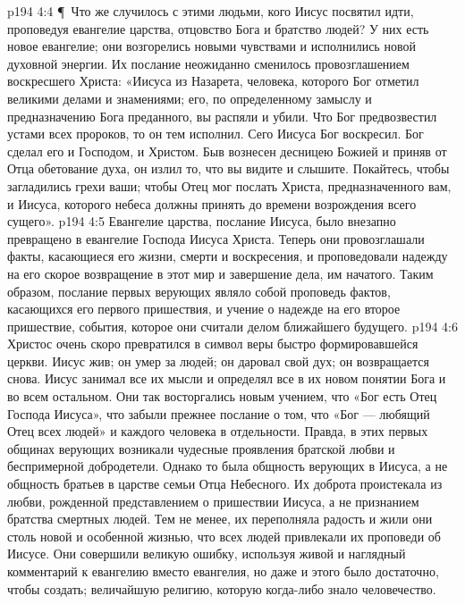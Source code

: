 \vs p194 4:4 \P\ Что же случилось с этими людьми, кого Иисус посвятил идти, проповедуя евангелие царства, отцовство Бога и братство людей? У них есть новое евангелие; они возгорелись новыми чувствами и исполнились новой духовной энергии. Их послание неожиданно сменилось провозглашением воскресшего Христа: «Иисуса из Назарета, человека, которого Бог отметил великими делами и знамениями; его, по определенному замыслу и предназначению Бога преданного, вы распяли и убили. Что Бог предвозвестил устами всех пророков, то он тем исполнил. Сего Иисуса Бог воскресил. Бог сделал его и Господом, и Христом. Быв вознесен десницею Божией и приняв от Отца обетование духа, он излил то, что вы видите и слышите. Покайтесь, чтобы загладились грехи ваши; чтобы Отец мог послать Христа, предназначенного вам, и Иисуса, которого небеса должны принять до времени возрождения всего сущего».
\vs p194 4:5 Евангелие царства, послание Иисуса, было внезапно превращено в евангелие Господа Иисуса Христа. Теперь они провозглашали факты, касающиеся его жизни, смерти и воскресения, и проповедовали надежду на его скорое возвращение в этот мир и завершение дела, им начатого. Таким образом, послание первых верующих являло собой проповедь фактов, касающихся его первого пришествия, и учение о надежде на его второе пришествие, события, которое они считали делом ближайшего будущего.
\vs p194 4:6 Христос очень скоро превратился в символ веры быстро формировавшейся церкви. Иисус жив; он умер за людей; он даровал свой дух; он возвращается снова. Иисус занимал все их мысли и определял все в их новом понятии Бога и во всем остальном. Они так восторгались новым учением, что «Бог есть Отец Господа Иисуса», что забыли прежнее послание о том, что «Бог --- любящий Отец всех людей» и каждого человека в отдельности. Правда, в этих первых общинах верующих возникали чудесные проявления братской любви и беспримерной добродетели. Однако то была общность верующих в Иисуса, а не общность братьев в царстве семьи Отца Небесного. Их доброта проистекала из любви, рожденной представлением о пришествии Иисуса, а не признанием братства смертных людей. Тем не менее, их переполняла радость и жили они столь новой и особенной жизнью, что всех людей привлекали их проповеди об Иисусе. Они совершили великую ошибку, используя живой и наглядный комментарий к евангелию вместо евангелия, но даже и этого было достаточно, чтобы создать; величайшую религию, которую когда\hyp{}либо знало человечество.
